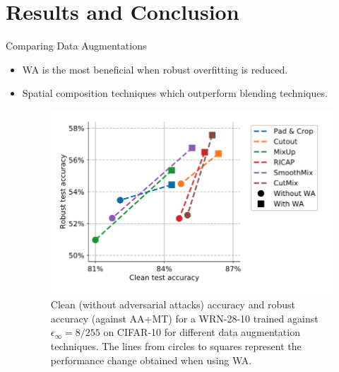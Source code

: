 \section{Results and Conclusion}

\begin{frame}{Comparing Data Augmentations}
    \begin{itemize}
        \item WA is the most beneficial when robust overfitting is reduced.
    \item Spatial composition techniques which outperform blending techniques.
        \begin{figure}
            \centering
            \includegraphics[height=.5\textheight]{pic/fig 4.png}
            \caption{Clean (without adversarial attacks) accuracy and robust accuracy (against AA+MT) for a WRN-28-10 trained against $\epsilon_\infty = 8/255$ on CIFAR-10 for different data augmentation techniques. The lines from circles to squares represent the performance change obtained when using WA.}
            \label{fig:fig4}
            \end{figure}
    \end{itemize}
\end{frame}

